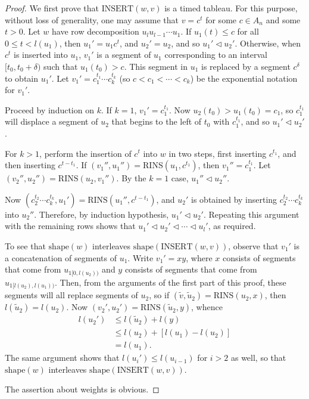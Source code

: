 \documentclass[10pt]{amsproc}
\theoremstyle{definition}
\theoremstyle{remark}
\newcommand{\rowins}{\mathrm{RINS}}
\newcommand{\ins}{\mathrm{INSERT}}
\newcommand{\shape}{\mathrm{shape}}
\begin{document}
\begin{proof}
  We first prove that $\ins(w,v)$ is a timed tableau.
  For this purpose, without loss of generality, one may assume that $v=c^t$ for some $c\in A_n$ and some $t>0$.
  Let $w$ have row decomposition $u_lu_{l-1}\dotsb u_1$.
  If $u_1(t)\leq c$ for all $0\leq t<l(u_1)$, then $u_1'=u_1c^t$, and $u_2'=u_2$, and so $u_1'\lhd u_2'$.
  Otherwise, when $c^t$ is inserted into $u_1$, $v_1'$ is a segment of $u_1$ corresponding to an interval $[t_0,t_0+\delta)$ such that $u_1(t_0)>c$.
  This segment in $u_1$ is replaced by a segment $c^\delta$ to obtain $u_1'$.
  Let $v_1'=c_1^{t_1}\dotsb c_k^{t_k}$ (so $c<c_1< \dotsb <c_k$) be the exponential notation for $v_1'$.

  Proceed by induction on $k$.
  If $k=1$, $v_1'=c_1^{t_1}$.
  Now $u_2(t_0)>u_1(t_0)=c_1$, so $c_1^{t_1}$ will displace a segment of $u_2$ that begins to the left of $t_0$ with $c_1^{t_1}$, and so $u_1'\lhd u_2'$.

  For $k>1$, perform the insertion of $c^t$ into $w$ in two steps, first inserting $c^{t_1}$, and then inserting $c^{t-t_1}$.
  If $(v_1'',u_1'')=\rowins(u_1,c^{t_1})$, then $v_1''=c_1^{t_1}$.
  Let $(v_2'',u_2'')=\rowins(u_2,v_1'')$.
  By the $k=1$ case, $u_1''\lhd u_2''$.
  
  Now $(c_2^{t_2}\dotsb c_k^{t_k},u_1')=\rowins(u_1'',c^{t-t_1})$, and $u_2'$ is obtained by inserting $c_2^{t_2}\dotsb c_k^{t_k}$ into $u_2''$.
  Therefore, by induction hypothesis, $u_1'\lhd u_2'$.
  Repeating this argument with the remaining rows shows that $u_1'\lhd u_2' \lhd \dotsb \lhd u_l'$, as required.

  To see that $\shape(w)$ interleaves $\shape(\ins(w,v))$, observe that $v_1'$ is a concatenation of segments of $u_1$.
  Write $v_1'=xy$, where $x$ consists of segments that come from $u_{1[0,l(u_2))}$ and $y$ consists of segments that come from $u_{1[l(u_2),l(u_1))}$.
  Then, from the arguments of the first part of this proof, these segments will all replace segments of $u_2$, so if $(\tilde v,\tilde u_2)=\rowins(u_2,x)$, then $l(\tilde u_2)=l(u_2)$.
  Now $(v_2',u_2')=\rowins(\tilde u_2,y)$, whence 
  \begin{align*}
    l(u_2') &\leq l(\tilde u_2)+l(y)\\
    &\leq l(u_2)+[l(u_1)-l(u_2)]\\
    & = l(u_1).
  \end{align*}
  The same argument shows that $l(u_i')\leq l(u_{i-1})$ for $i>2$ as well, so that $\shape(w)$ interleaves $\shape(\ins(w,v))$.

  The assertion about weights is obvious.
\end{proof}
\end{document}
